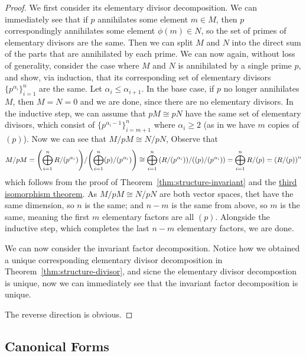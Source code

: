 \begin{proof}
    We first consider its elementary divisor decomposition.
    We can immediately see that if \(p\) annihilates some element \(m \in M\),
    then \(p\) correspondingly annihilates some element \(\phi(m) \in N\),
    so the set of primes of elementary divisors are the same.
    Then we can split \(M\) and \(N\) into the direct sum of the parts that are annihilated by each prime.
    We can now again, without loss of generality,
    consider the case where \(M\) and \(N\) is annihilated by a single prime \(p\),
    and show, via induction,
    that its corresponding set of elementary divisors \({\{p^{\alpha_i}\}}_{i=1}^n\) are the same.
    Let \(\alpha_i \leq \alpha_{i+1}\).
    In the base case, if \(p\) no longer annihilates \(M\),
    then \(M = N = 0\) and we are done, since there are no elementary divisors.
    In the inductive step,
    we can assume that \(pM \cong pN\) have the same set of elementary divisors,
    which consist of \({\{p^{\alpha_i-1}\}}_{i=m+1}^n\) where \(\alpha_i \geq 2\)
    (as in we have \(m\) copies of \((p)\)).
    Now we can see that \(M/pM \cong N/pN\),
    Observe that
    \begin{equation*}
        M/pM = \pqty{\bigoplus_{i=1}^n R/(p^{\alpha_i})}/\pqty{\bigoplus_{i=1}^n (p)/(p^{\alpha_i})}
        \cong \bigoplus_{i=1}^n \pqty{R/(p^{\alpha_i})}/\pqty{(p)/(p^{\alpha_i})}
        = \bigoplus_{i=1}^n R/(p)
        = \pqty{R/(p)}^n
    \end{equation*}
    which follows from the proof of Theorem~\ref{thm:structure-invariant}
    and the \hyperref[thm:iso-3-mod]{third isomorphism theorem}.
    As \(M/pM \cong N/pN\) are both vector spaces,
    thet have the same dimension, so \(n\) is the same;
    and \(n-m\) is the same from above,
    so \(m\) is the same,
    meaning the first \(m\) elementary factors are all \((p)\).
    Alongside the inductive step, which completes the last \(n-m\) elementary factors, we are done.

    We can now consider the invariant factor decomposition.
    Notice how we obtained a unique corresponding elementary divisor decomposition
    in Theorem~\ref{thm:structure-divisor},
    and sicne the elementary divisor decompostion is unique,
    now we can immediately see that the invariant factor decomposition is unique.

    The reverse direction is obvious.
\end{proof}

\subsection*{Canonical Forms}
